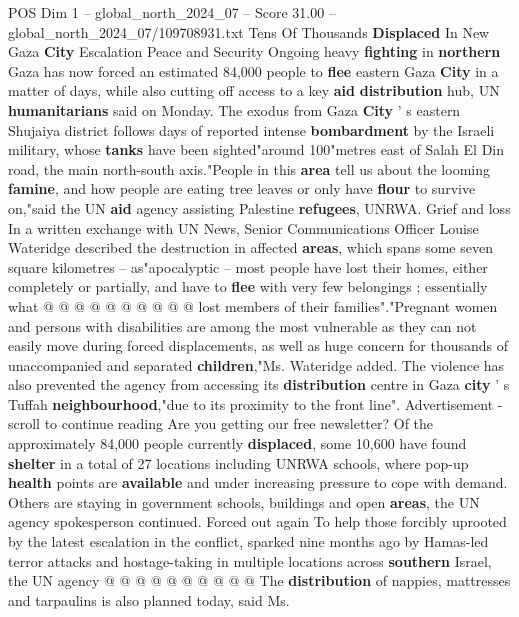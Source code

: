 \begin{textsample}{POS Dim 1 – global\_north\_2024\_07 – Score 31.00 – global\_north\_2024\_07/109708931.txt}  \label{ex:f1_pos_389}
Tens Of Thousands \textbf{Displaced} In New Gaza \textbf{City} Escalation Peace and Security Ongoing heavy \textbf{fighting} in \textbf{northern} Gaza has now forced an estimated 84,000 people to \textbf{flee} eastern Gaza \textbf{City} in a matter of days, while also cutting off access to a key \textbf{aid} \textbf{distribution} hub, UN \textbf{humanitarians} said on Monday.
The exodus from Gaza \textbf{City} ' s eastern Shujaiya district follows days of reported intense \textbf{bombardment} by the Israeli military, whose \textbf{tanks} have been sighted"around 100"metres east of Salah El Din road, the main north-south axis."People in this \textbf{area} tell us about the looming \textbf{famine}, and how people are eating tree leaves or only have \textbf{flour} to survive on,"said the UN \textbf{aid} agency assisting Palestine \textbf{refugees}, UNRWA.
Grief and loss In a written exchange with UN News, Senior Communications Officer Louise Wateridge described the destruction in affected \textbf{areas}, which spans some seven square kilometres -- as"apocalyptic -- most people have lost their homes, either completely or partially, and have to \textbf{flee} with very few belongings ; essentially what @ @ @ @ @ @ @ @ @ @ lost members of their families"."Pregnant women and persons with disabilities are among the most vulnerable as they can not easily move during forced displacements, as well as huge concern for thousands of unaccompanied and separated \textbf{children},"Ms.
Wateridge added.
The violence has also prevented the agency from accessing its \textbf{distribution} centre in Gaza \textbf{city} ' s Tuffah \textbf{neighbourhood},"due to its proximity to the front line".
Advertisement - scroll to continue reading Are you getting our free newsletter?
Of the approximately 84,000 people currently \textbf{displaced}, some 10,600 have found \textbf{shelter} in a total of 27 locations including UNRWA schools, where pop-up \textbf{health} points are \textbf{available} and under increasing pressure to cope with demand.
Others are staying in government schools, buildings and open \textbf{areas}, the UN agency spokesperson continued.
Forced out again To help those forcibly uprooted by the latest escalation in the conflict, sparked nine months ago by Hamas-led terror attacks and hostage-taking in multiple locations across \textbf{southern} Israel, the UN agency @ @ @ @ @ @ @ @ @ @ The \textbf{distribution} of nappies, mattresses and tarpaulins is also planned today, said Ms.

\end{textsample}
